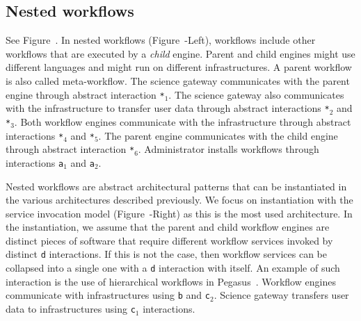 \documentclass[preprint,3p,twocolumn]{elsarticle}
\begin{document}
\subsection{Nested workflows}

See Figure~. In nested workflows
(Figure~-Left), workflows include other
workflows that are executed by a \emph{child} engine. Parent
and child engines might use different languages and might run on
different infrastructures. A parent workflow is
also called meta-workflow. The science gateway communicates with the
parent engine through abstract interaction \texttt{*$_1$}. The science
gateway also communicates with the infrastructure to transfer user
data through abstract interactions \texttt{*$_2$} and
\texttt{*$_3$}. Both workflow engines communicate with the
infrastructure through abstract interactions \texttt{*$_4$} and
\texttt{*$_5$}. The parent engine communicates with the child engine
through abstract interaction \texttt{*$_6$}. Administrator installs
workflows through interactions \texttt{a$_1$} and \texttt{a$_2$}.

Nested workflows are abstract architectural patterns that can be
instantiated in the various architectures described previously. We
focus on instantiation with the service invocation model
(Figure~-Right) as this is the most used
architecture. In the instantiation, we assume that the parent and
child workflow engines are distinct pieces of software that require
different workflow services invoked by distinct \texttt{d}
interactions. If this is not the case, then workflow services can be
collapsed into a single one with a \texttt{d} interaction with
itself. An example of such interaction is the use of hierarchical
workflows in Pegasus~\cite{Deelman201517}.
Workflow engines communicate with infrastructures using
\texttt{b} and \texttt{c$_2$}. Science gateway transfers user data to
infrastructures using \texttt{c$_1$} interactions.
\end{document}
